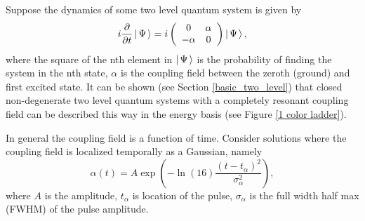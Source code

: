 Suppose the dynamics of some two level quantum system is given by
\begin{equation}
i\frac{\partial}{\partial t} \left| \hspace{0.15em} \Psi \hspace{0.15em}\right\rangle
=
i\left(
\begin{array}{cc}
0 & \alpha \\
-\alpha & 0 \\
\end{array}
\right)
\left| \hspace{0.15em} \Psi \hspace{0.15em}\right\rangle,
\label{one dynamics}
\end{equation}
where the square of the nth element in $\left| \hspace{0.15em} \Psi \hspace{0.15em}\right\rangle$ is the probability of finding the system in the nth state, $\alpha$ is the coupling field between the zeroth (ground) and first excited state. It can be shown (see Section \ref{basic_two_level}) that closed non-degenerate two level quantum systems with a completely resonant coupling field can be described this way in the energy basis (see Figure \ref{1 color ladder}).

In general the coupling field is a function of time. Consider solutions where the coupling field is localized temporally as a Gaussian, namely
\begin{equation}
\boxed{
\alpha(t)
=
A
\exp
\left(
-\ln(16)
\frac
{(t - t_\alpha)^2}
{\sigma_\alpha^2}
\right),
\label{gaussian}
}
\end{equation}
where $A$ is the amplitude, $t_\alpha$ is location of the pulse, $\sigma_\alpha$ is the full width half max (FWHM) of the pulse amplitude.

